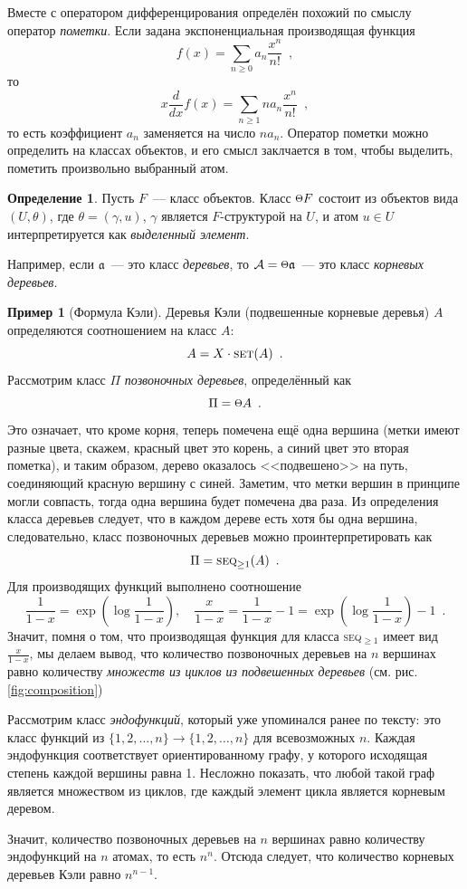 \documentclass{article}
\def \point {\raisebox{.1\height}{\scalebox{0.8}{$\Theta$}}}
\theoremstyle{definition}
\newtheorem{example}{Пример}
\newtheorem*{definition}{Определение}
\begin{document}
Вместе с оператором дифференцирования определён похожий по смыслу оператор
\textit{пометки}. Если задана экспоненциальная производящая функция
\[
    f(x) = \sum_{n \geq 0} a_n \dfrac{x^n}{n!} \enspace ,
\]
то
\[
    x \dfrac{d}{dx} f(x) = \sum_{n \geq 1} n a_n \dfrac{x^n}{n!} \enspace ,
\]
то есть коэффициент \( a_n \) заменяется на число \( n a_n \). Оператор пометки
можно определить на классах объектов, и его смысл заклчается в том, чтобы
выделить, пометить произвольно выбранный атом.
\begin{definition}
    Пусть \( F \)~--- класс объектов. Класс \( \point F \) состоит из объектов
вида \( (U, \theta) \), где \( \theta = (\gamma, u) \), \( \gamma \) является \(
F \)-структурой на \( U \), и атом \(u \in U \) интерпретируется как
\textit{выделенный элемент}.
\end{definition}

Например, если \( \mathfrak a \)~--- это класс \textit{деревьев}, то \(\mathcal A =
\point \mathfrak a \)~--- это класс \textit{корневых деревьев}.

\begin{example}[Формула Кэли]
    Деревья Кэли (подвешенные корневые деревья) \( A \) определяются соотношением на класс \( A \):
\[
    A = X \cdot \text{\textsc{set}}(A) \enspace .
\]
Рассмотрим класс \( \Pi \) \textit{позвоночных деревьев}, определённый как
\[
    \Pi = \point A \enspace .               
\]
Это означает, что кроме корня, теперь помечена ещё одна вершина 
(метки имеют разные цвета, скажем, красный цвет это корень, а синий цвет это
вторая пометка), и таким образом, дерево
оказалось <<подвешено>> на путь, соединяющий красную вершину с синей. Заметим,
что метки вершин в принципе могли совпасть, тогда одна вершина будет помечена
два раза. Из
определения класса деревьев следует, что в каждом дереве есть хотя бы одна
вершина, следовательно, класс позвоночных деревьев можно проинтерпретировать как
\[
    \Pi = \text{\textsc{seq}}_{\geq 1} (A) \enspace .
\]
Для производящих функций выполнено соотношение
\[
    \dfrac{1}{1-x} = \exp \left(
        \log \dfrac{1}{1 - x}
    \right), \quad
    \dfrac{x}{1-x} = \dfrac{1}{1 -x} - 1 =  \exp \left(
        \log \dfrac{1}{1 - x}
    \right) - 1 \enspace .
\]
Значит, помня о том, что производящая функция для класса \textsc{seq}$_{\geq 1}$
имеет вид \(\frac{x}{1-x}\), мы делаем вывод, что количество позвоночных
деревьев на \( n \) вершинах равно количеству \textit{множеств из циклов из
подвешенных деревьев} (см. рис. \ref{fig:composition})

Рассмотрим класс \textit{эндофункций}, который уже упоминался ранее по тексту:
это класс функций из \( \{ 1, 2, \ldots, n \} \to \{1, 2, \ldots, n\} \) для
всевозможных \( n \). Каждая эндофункция соответствует ориентированному графу, у
которого исходящая степень каждой вершины равна 1. Несложно показать, что любой
такой граф является множеством из циклов, где каждый элемент цикла является
корневым деревом.

Значит, количество позвоночных деревьев на \( n \) вершинах равно количеству
эндофункций на \( n \) атомах, то есть \( n^n \). Отсюда следует, что количество корневых деревьев
Кэли равно \( n^{n-1} \).
\end{example}
\end{document}
